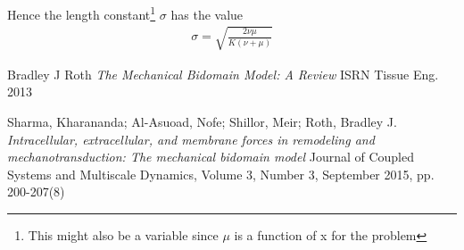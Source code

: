 \documentclass[a4paper,oneside,11pt]{report}
\begin{document}
Hence the length constant\footnote{This might also be a variable since $\mu$ is a function of x for the problem} $\sigma$ has the value
\begin{equation}
\begin{aligned}
\sigma = \sqrt{\frac{2\nu\mu}{K(\nu + \mu)}}
\end{aligned}
\end{equation}
\begin{thebibliography}{9}
	Bradley J Roth
	\textit{The Mechanical Bidomain Model: A Review}
	ISRN Tissue Eng. 2013
	
	 Sharma, Kharananda; Al-Asuoad, Nofe; Shillor, Meir; Roth, Bradley J.
	\textit{Intracellular, extracellular, and membrane forces in remodeling and mechanotransduction: The mechanical bidomain model}
	Journal of Coupled Systems and Multiscale Dynamics, Volume 3, Number 3, September 2015, pp. 200-207(8)
\end{thebibliography}
\end{document}
